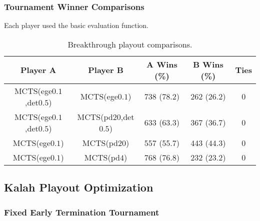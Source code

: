 \documentclass{article}
\begin{document}
\subsubsection{Tournament Winner Comparisons}

%

Each player used the basic evaluation function.

\begin{table}[h!]
\begin{center}
\begin{tabular}{|c|c|ccc|}
\hline
Player A & Player B                             & A Wins (\%)  & B Wins (\%)  & Ties \\ 
\hline
MCTS(ege$0.1$,det$0.5$) & MCTS(ege$0.1$)        & 738 (78.2)   & 262 (26.2)   & 0    \\
MCTS(ege$0.1$,det$0.5$) & MCTS(pd$20$,det$0.5$) & 633 (63.3)   & 367 (36.7)   & 0    \\
MCTS(ege$0.1$)          & MCTS(pd$20$)          & 557 (55.7)   & 443 (44.3)   & 0    \\
MCTS(ege$0.1$)          & MCTS(pd$4$)           & 768 (76.8)   & 232 (23.2)   & 0    \\
\hline
\end{tabular}
\end{center}
\caption{Breakthrough playout comparisons.}
\end{table}

\subsection{Kalah Playout Optimization}

\subsubsection{Fixed Early Termination Tournament}
\end{document}
